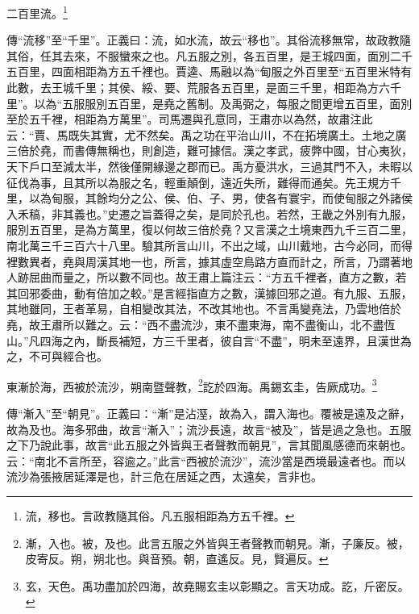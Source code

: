 二百里流。\footnote{流，移也。言政教隨其俗。凡五服相距為方五千裡。}

{\noindent\zhuan{}\fzbyks 傳“流移”至“千里”。正義曰：流，如水流，故云“移也”。其俗流移無常，故政教隨其俗，任其去來，不服蠻來之也。凡五服之別，各五百里，是王城四面，面別二千五百里，四面相距為方五千裡也。賈逵、馬融以為“甸服之外百里至“五百里米特有此數，去王城千里；其侯、綏、要、荒服各五百里，是面三千里，相距為方六千里”。以為“五服服別五百里，是堯之舊制。及禹弼之，每服之間更增五百里，面別至於五千裡，相距為方萬里”。司馬遷與孔意同，王肅亦以為然，故肅注此云：“賈、馬既失其實，尤不然矣。禹之功在平治山川，不在拓境廣土。土地之廣三倍於堯，而書傳無稱也，則創造，難可據信。漢之孝武，疲弊中國，甘心夷狄，天下戶口至減太半，然後僅開緣邊之郡而已。禹方憂洪水，三過其門不入，未暇以征伐為事，且其所以為服之名，輕重顛倒，遠近失所，難得而通矣。先王規方千里，以為甸服，其餘均分之公、侯、伯、子、男，使各有寰宇，而使甸服之外諸侯入禾稿，非其義也。”史遷之旨蓋得之矣，是同於孔也。若然，王畿之外別有九服，服別五百里，是為方萬里，復以何故三倍於堯？又言漢之土境東西九千三百二里，南北萬三千三百六十八里。驗其所言山川，不出之域，山川戴地，古今必同，而得裡數異者，堯與周漢其地一也，所言，據其虛空鳥路方直而計之，所言，乃謂著地人跡屈曲而量之，所以數不同也。故王肅上篇注云：“方五千裡者，直方之數，若其回邪委曲，動有倍加之較。”是言經指直方之數，漢據回邪之道。有九服、五服，其地雖同，王者革易，自相變改其法，不改其地也。不言禹變堯法，乃雲地倍於堯，故王肅所以難之。云：“西不盡流沙，東不盡東海，南不盡衡山，北不盡恆山。”凡四海之內，斷長補短，方三千里者，彼自言“不盡”，明未至遠界，且漢世為之，不可與經合也。 \par}

東漸於海，西被於流沙，朔南暨聲教，\footnote{漸，入也。被，及也。此言五服之外皆與王者聲教而朝見。漸，子廉反。被，皮寄反。朔，朔北也。與音預。朝，直遙反。見，賢遍反。}訖於四海。禹錫玄圭，告厥成功。\footnote{玄，天色。禹功盡加於四海，故堯賜玄圭以彰顯之。言天功成。訖，斤密反。}

{\noindent\zhuan{}\fzbyks 傳“漸入”至“朝見”。正義曰：“漸”是沾溼，故為入，謂入海也。覆被是遠及之辭，故為及也。海多邪曲，故言“漸入”；流沙長遠，故言“被及”，皆是過之急也。五服之下乃說此事，故言“此五服之外皆與王者聲教而朝見”，言其聞風感德而來朝也。云：“南北不言所至，容逾之。”此言“西被於流沙”，流沙當是西境最遠者也。而以流沙為張掖居延澤是也，計三危在居延之西，太遠矣，言非也。 \par}

